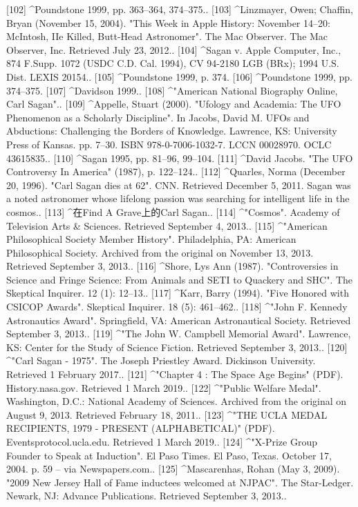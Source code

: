 [102]
^Poundstone 1999, pp. 363–364, 374–375..
[103]
^Linzmayer, Owen; Chaffin, Bryan (November 15, 2004). "This Week in Apple History: November 14–20: McIntosh, IIe Killed, Butt-Head Astronomer". The Mac Observer. The Mac Observer, Inc. Retrieved July 23, 2012..
[104]
^Sagan v. Apple Computer, Inc., 874 F.Supp. 1072 (USDC C.D. Cal. 1994), CV 94-2180 LGB (BRx); 1994 U.S. Dist. LEXIS 20154..
[105]
^Poundstone 1999, p. 374.
[106]
^Poundstone 1999, pp. 374–375.
[107]
^Davidson 1999..
[108]
^"American National Biography Online, Carl Sagan"..
[109]
^Appelle, Stuart (2000). "Ufology and Academia: The UFO Phenomenon as a Scholarly Discipline". In Jacobs, David M. UFOs and Abductions: Challenging the Borders of Knowledge. Lawrence, KS: University Press of Kansas. pp. 7–30. ISBN 978-0-7006-1032-7. LCCN 00028970. OCLC 43615835..
[110]
^Sagan 1995, pp. 81–96, 99–104.
[111]
^David Jacobs. "The UFO Controversy In America" (1987), p. 122–124..
[112]
^Quarles, Norma (December 20, 1996). "Carl Sagan dies at 62". CNN. Retrieved December 5, 2011. Sagan was a noted astronomer whose lifelong passion was searching for intelligent life in the cosmos..
[113]
^在Find A Grave上的Carl Sagan..
[114]
^"Cosmos". Academy of Television Arts & Sciences. Retrieved September 4, 2013..
[115]
^"American Philosophical Society Member History". Philadelphia, PA: American Philosophical Society. Archived from the original on November 13, 2013. Retrieved September 3, 2013..
[116]
^Shore, Lys Ann (1987). "Controversies in Science and Fringe Science: From Animals and SETI to Quackery and SHC". The Skeptical Inquirer. 12 (1): 12–13..
[117]
^Karr, Barry (1994). "Five Honored with CSICOP Awards". Skeptical Inquirer. 18 (5): 461–462..
[118]
^"John F. Kennedy Astronautics Award". Springfield, VA: American Astronautical Society. Retrieved September 3, 2013..
[119]
^"The John W. Campbell Memorial Award". Lawrence, KS: Center for the Study of Science Fiction. Retrieved September 3, 2013..
[120]
^"Carl Sagan - 1975". The Joseph Priestley Award. Dickinson University. Retrieved 1 February 2017..
[121]
^"Chapter 4 : The Space Age Begins" (PDF). History.nasa.gov. Retrieved 1 March 2019..
[122]
^"Public Welfare Medal". Washington, D.C.: National Academy of Sciences. Archived from the original on August 9, 2013. Retrieved February 18, 2011..
[123]
^"THE UCLA MEDAL RECIPIENTS, 1979 - PRESENT (ALPHABETICAL)" (PDF). Eventsprotocol.ucla.edu. Retrieved 1 March 2019..
[124]
^"X-Prize Group Founder to Speak at Induction". El Paso Times. El Paso, Texas. October 17, 2004. p. 59 – via Newspapers.com..
[125]
^Mascarenhas, Rohan (May 3, 2009). "2009 New Jersey Hall of Fame inductees welcomed at NJPAC". The Star-Ledger. Newark, NJ: Advance Publications. Retrieved September 3, 2013..
